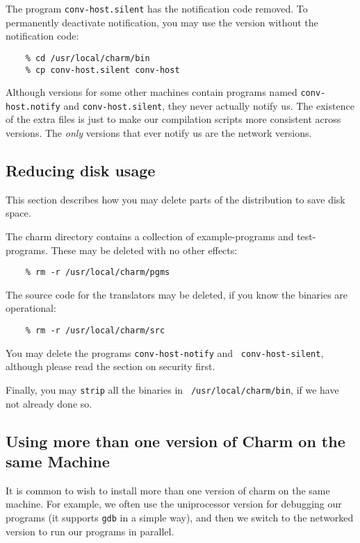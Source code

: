 The program {\tt conv-host.silent} has the notification code removed.  To
permanently deactivate notification, you may use the version without the
notification code:

\begin{verbatim}
    % cd /usr/local/charm/bin
    % cp conv-host.silent conv-host
\end{verbatim}

Although versions for some other machines contain
programs named {\tt conv-host.notify} and {\tt conv-host.silent}, they
never actually notify us.  The existence of the extra files is just to
make our compilation scripts more consistent across versions.  The
{\em only} versions that ever notify us are the network versions.

\subsection{Reducing disk usage}

This section describes how you may delete parts of the distribution to
save disk space.  

The charm directory contains a collection of example-programs and
test-programs.  These may be deleted with no other effects:

\begin{verbatim}
    % rm -r /usr/local/charm/pgms
\end{verbatim}

The source code for the translators may be deleted, if you know the
binaries are operational:

\begin{verbatim}
    % rm -r /usr/local/charm/src
\end{verbatim}

You may delete the programs {\tt conv-host-notify} and {\tt
conv-host-silent}, although please read the section on security first.

Finally, you may {\tt strip} all the binaries in {\tt
/usr/local/charm/bin}, if we have not already done so.

\subsection{Using more than one version of Charm on the same Machine}

It is common to wish to install more than one version of charm on the
same machine.  For example, we often use the uniprocessor version for
debugging our programs (it supports {\tt gdb} in a simple way), and
then we switch to the networked version to run our programs in
parallel.


